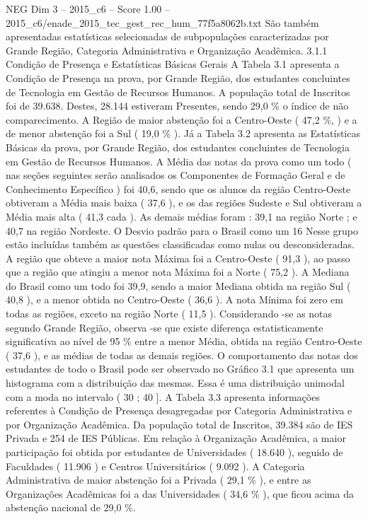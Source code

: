 \begin{textsample}{NEG Dim 3 – 2015\_c6 – Score 1.00 – 2015\_c6/enade\_2015\_tec\_gest\_rec\_hum\_77f5a8062b.txt}
São também apresentadas estatísticas selecionadas de subpopulações caracterizadas por Grande Região, Categoria Administrativa e Organização Acadêmica. 3.1.1 Condição de Presença e Estatísticas Básicas Gerais A Tabela 3.1 apresenta a Condição de Presença na prova, por Grande Região, dos estudantes concluintes de Tecnologia em Gestão de Recursos Humanos.
A população total de Inscritos foi de 39.638.
Destes, 28.144 estiveram Presentes, sendo 29,0 \% o índice de não comparecimento.
A Região de maior abstenção foi a Centro-Oeste ( 47,2 \%, ) e a de menor abstenção foi a Sul ( 19,0 \% ).
Já a Tabela 3.2 apresenta as Estatísticas Básicas da prova, por Grande Região, dos estudantes concluintes de Tecnologia em Gestão de Recursos Humanos.
A Média das notas da prova como um todo ( nas seções seguintes serão analisados os Componentes de Formação Geral e de Conhecimento Específico ) foi 40,6, sendo que os alunos da região Centro-Oeste obtiveram a Média mais baixa ( 37,6 ), e os das regiões Sudeste e Sul obtiveram a Média mais alta ( 41,3 cada ).
As demais médias foram : 39,1 na região Norte ; e 40,7 na região Nordeste.
O Desvio padrão para o Brasil como um 16 Nesse grupo estão incluídas também as questões classificadas como nulas ou desconsideradas.
A região que obteve a maior nota Máxima foi a Centro-Oeste ( 91,3 ), ao passo que a região que atingiu a menor nota Máxima foi a Norte ( 75,2 ).
A Mediana do Brasil como um todo foi 39,9, sendo a maior Mediana obtida na região Sul ( 40,8 ), e a menor obtida no Centro-Oeste ( 36,6 ).
A nota Mínima foi zero em todas as regiões, exceto na região Norte ( 11,5 ).
Considerando -se as notas segundo Grande Região, observa -se que existe diferença estatisticamente significativa ao nível de 95 \% entre a menor Média, obtida na região Centro-Oeste ( 37,6 ), e as médias de todas as demais regiões.
O comportamento das notas dos estudantes de todo o Brasil pode ser observado no Gráfico 3.1 que apresenta um histograma com a distribuição das mesmas.
Essa é uma distribuição unimodal com a moda no intervalo ( 30 ; 40 ].
A Tabela 3.3 apresenta informações referentes à Condição de Presença desagregadas por Categoria Administrativa e por Organização Acadêmica.
Da população total de Inscritos, 39.384 são de IES Privada e 254 de IES Públicas.
Em relação à Organização Acadêmica, a maior participação foi obtida por estudantes de Universidades ( 18.640 ), seguido de Faculdades ( 11.906 ) e Centros Universitários ( 9.092 ).
A Categoria Administrativa de maior abstenção foi a Privada ( 29,1 \% ), e entre as Organizações Acadêmicas foi a das Universidades ( 34,6 \% ), que ficou acima da abstenção nacional de 29,0 \%.

\end{textsample}
